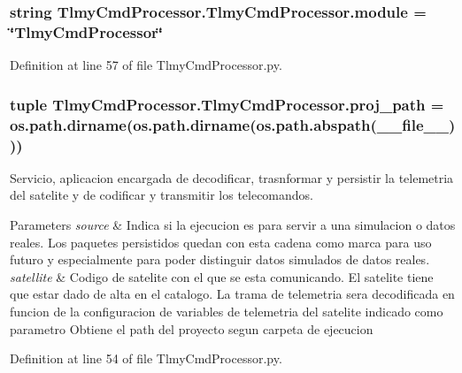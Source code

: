 \subsubsection[{module}]{\setlength{\rightskip}{0pt plus 5cm}string Tlmy\+Cmd\+Processor.\+Tlmy\+Cmd\+Processor.\+module = \char`\"{}Tlmy\+Cmd\+Processor\char`\"{}}\label{namespace_tlmy_cmd_processor_1_1_tlmy_cmd_processor_a8f2365862c9bbb4fe399b2d3f801b4d5}


Definition at line 57 of file Tlmy\+Cmd\+Processor.\+py.

\hypertarget{namespace_tlmy_cmd_processor_1_1_tlmy_cmd_processor_af01cc83846e14e401a5a2fbaec2fe940}{}
\subsubsection[{proj\+\_\+path}]{\setlength{\rightskip}{0pt plus 5cm}tuple Tlmy\+Cmd\+Processor.\+Tlmy\+Cmd\+Processor.\+proj\+\_\+path = os.\+path.\+dirname(os.\+path.\+dirname(os.\+path.\+abspath(\+\_\+\+\_\+file\+\_\+\+\_\+)))}\label{namespace_tlmy_cmd_processor_1_1_tlmy_cmd_processor_af01cc83846e14e401a5a2fbaec2fe940}


Servicio, aplicacion encargada de decodificar, trasnformar y persistir la telemetria del satelite y de codificar y transmitir los telecomandos. 


\begin{DoxyParams}{Parameters}
{\em source} & Indica si la ejecucion es para servir a una simulacion o datos reales. Los paquetes persistidos quedan con esta cadena como marca para uso futuro y especialmente para poder distinguir datos simulados de datos reales. \\
\hline
{\em satellite} & Codigo de satelite con el que se esta comunicando. El satelite tiene que estar dado de alta en el catalogo. La trama de telemetria sera decodificada en funcion de la configuracion de variables de telemetria del satelite indicado como parametro Obtiene el path del proyecto segun carpeta de ejecucion \\
\hline
\end{DoxyParams}


Definition at line 54 of file Tlmy\+Cmd\+Processor.\+py.

\hypertarget{namespace_tlmy_cmd_processor_1_1_tlmy_cmd_processor_a5b740cec8cab496e71b6896c16dfba9d}{}
